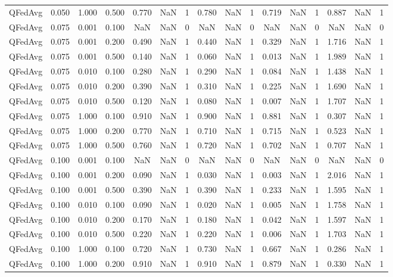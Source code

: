 \begin{table}[htbp]
\begin{tabular}{lccccccccccccccc}
QFedAvg & 0.050 & 1.000 & 0.500 & 0.770 & NaN & 1 & 0.780 & NaN & 1 & 0.719 & NaN & 1 & 0.887 & NaN & 1 \\
QFedAvg & 0.075 & 0.001 & 0.100 & NaN & NaN & 0 & NaN & NaN & 0 & NaN & NaN & 0 & NaN & NaN & 0 \\
QFedAvg & 0.075 & 0.001 & 0.200 & 0.490 & NaN & 1 & 0.440 & NaN & 1 & 0.329 & NaN & 1 & 1.716 & NaN & 1 \\
QFedAvg & 0.075 & 0.001 & 0.500 & 0.140 & NaN & 1 & 0.060 & NaN & 1 & 0.013 & NaN & 1 & 1.989 & NaN & 1 \\
QFedAvg & 0.075 & 0.010 & 0.100 & 0.280 & NaN & 1 & 0.290 & NaN & 1 & 0.084 & NaN & 1 & 1.438 & NaN & 1 \\
QFedAvg & 0.075 & 0.010 & 0.200 & 0.390 & NaN & 1 & 0.310 & NaN & 1 & 0.225 & NaN & 1 & 1.690 & NaN & 1 \\
QFedAvg & 0.075 & 0.010 & 0.500 & 0.120 & NaN & 1 & 0.080 & NaN & 1 & 0.007 & NaN & 1 & 1.707 & NaN & 1 \\
QFedAvg & 0.075 & 1.000 & 0.100 & 0.910 & NaN & 1 & 0.900 & NaN & 1 & 0.881 & NaN & 1 & 0.307 & NaN & 1 \\
QFedAvg & 0.075 & 1.000 & 0.200 & 0.770 & NaN & 1 & 0.710 & NaN & 1 & 0.715 & NaN & 1 & 0.523 & NaN & 1 \\
QFedAvg & 0.075 & 1.000 & 0.500 & 0.760 & NaN & 1 & 0.720 & NaN & 1 & 0.702 & NaN & 1 & 0.707 & NaN & 1 \\
QFedAvg & 0.100 & 0.001 & 0.100 & NaN & NaN & 0 & NaN & NaN & 0 & NaN & NaN & 0 & NaN & NaN & 0 \\
QFedAvg & 0.100 & 0.001 & 0.200 & 0.090 & NaN & 1 & 0.030 & NaN & 1 & 0.003 & NaN & 1 & 2.016 & NaN & 1 \\
QFedAvg & 0.100 & 0.001 & 0.500 & 0.390 & NaN & 1 & 0.390 & NaN & 1 & 0.233 & NaN & 1 & 1.595 & NaN & 1 \\
QFedAvg & 0.100 & 0.010 & 0.100 & 0.090 & NaN & 1 & 0.020 & NaN & 1 & 0.005 & NaN & 1 & 1.758 & NaN & 1 \\
QFedAvg & 0.100 & 0.010 & 0.200 & 0.170 & NaN & 1 & 0.180 & NaN & 1 & 0.042 & NaN & 1 & 1.597 & NaN & 1 \\
QFedAvg & 0.100 & 0.010 & 0.500 & 0.220 & NaN & 1 & 0.220 & NaN & 1 & 0.006 & NaN & 1 & 1.703 & NaN & 1 \\
QFedAvg & 0.100 & 1.000 & 0.100 & 0.720 & NaN & 1 & 0.730 & NaN & 1 & 0.667 & NaN & 1 & 0.286 & NaN & 1 \\
QFedAvg & 0.100 & 1.000 & 0.200 & 0.910 & NaN & 1 & 0.910 & NaN & 1 & 0.879 & NaN & 1 & 0.330 & NaN & 1 \\

\end{tabular}
\end{table}
